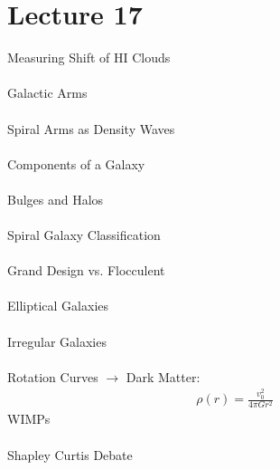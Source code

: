 \documentclass[11pt,reqno]{article}
\theoremstyle{definition}
\begin{document}
\section*{Lecture 17}
Measuring Shift of HI Clouds\\\\
Galactic Arms\\\\
Spiral Arms as Density Waves\\\\
Components of a Galaxy\\\\
Bulges and Halos\\\\
Spiral Galaxy Classification\\\\
Grand Design vs. Flocculent\\\\
Elliptical Galaxies\\\\
Irregular Galaxies\\\\
Rotation Curves $\rightarrow$ Dark Matter:
\begin{align*}
    \rho(r) = \frac{v_0^2}{4\pi Gr^2}
\end{align*}
WIMPs\\\\
Shapley Curtis Debate\\\\
\end{document}
